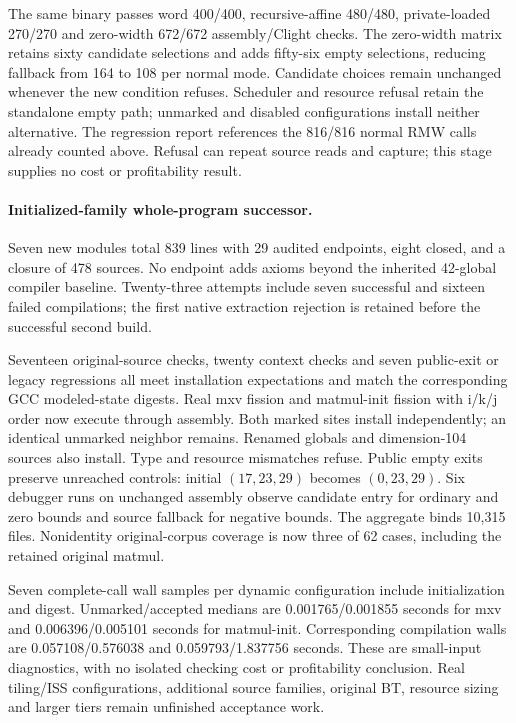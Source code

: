 The same binary passes word 400/400, recursive-affine 480/480,
private-loaded 270/270 and zero-width 672/672 assembly/Clight checks. The
zero-width matrix retains sixty candidate selections and adds fifty-six empty
selections, reducing fallback from 164 to 108 per normal mode. Candidate
choices remain unchanged whenever the new condition refuses. Scheduler and
resource refusal retain the standalone empty path; unmarked and disabled
configurations install neither alternative. The regression report references
the 816/816 normal RMW calls already counted above. Refusal can repeat source
reads and capture; this stage supplies no cost or profitability result.


\paragraph{Initialized-family whole-program successor.}
Seven new modules total 839 lines with 29 audited endpoints, eight closed,
and a closure of 478 sources. No endpoint adds axioms beyond the inherited
42-global compiler baseline. Twenty-three attempts include seven successful
and sixteen failed compilations; the first native extraction rejection is
retained before the successful second build.

Seventeen original-source checks, twenty context checks and seven public-exit
or legacy regressions all meet installation expectations and match the
corresponding GCC modeled-state digests. Real mxv fission and matmul-init
fission with i/k/j order now execute through assembly. Both marked sites
install independently; an identical unmarked neighbor remains. Renamed globals
and dimension-104 sources also install. Type and resource mismatches refuse.
Public empty exits preserve unreached controls: initial $(17,23,29)$ becomes
$(0,23,29)$. Six debugger runs on unchanged assembly observe candidate entry
for ordinary and zero bounds and source fallback for negative bounds. The
aggregate binds 10,315 files. Nonidentity original-corpus coverage is now
three of 62 cases, including the retained original matmul.

Seven complete-call wall samples per dynamic configuration include initialization
and digest. Unmarked/accepted medians are 0.001765/0.001855 seconds for mxv
and 0.006396/0.005101 seconds for matmul-init. Corresponding compilation walls
are 0.057108/0.576038 and 0.059793/1.837756 seconds. These are small-input
diagnostics, with no isolated checking cost or profitability conclusion.
Real tiling/ISS configurations, additional source families, original BT,
resource sizing and larger tiers remain unfinished acceptance work.

